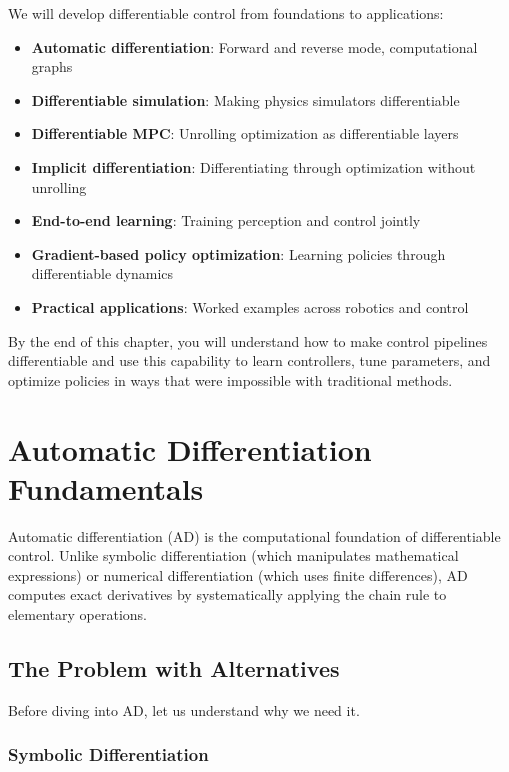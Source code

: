 We will develop differentiable control from foundations to applications:

\begin{itemize}
    \item \textbf{Automatic differentiation}: Forward and reverse mode, computational graphs
    \item \textbf{Differentiable simulation}: Making physics simulators differentiable
    \item \textbf{Differentiable MPC}: Unrolling optimization as differentiable layers
    \item \textbf{Implicit differentiation}: Differentiating through optimization without unrolling
    \item \textbf{End-to-end learning}: Training perception and control jointly
    \item \textbf{Gradient-based policy optimization}: Learning policies through differentiable dynamics
    \item \textbf{Practical applications}: Worked examples across robotics and control
\end{itemize}

By the end of this chapter, you will understand how to make control pipelines differentiable and use this capability to learn controllers, tune parameters, and optimize policies in ways that were impossible with traditional methods.

\section{Automatic Differentiation Fundamentals}
\label{sec:autodiff}

Automatic differentiation (AD) is the computational foundation of differentiable control. Unlike symbolic differentiation (which manipulates mathematical expressions) or numerical differentiation (which uses finite differences), AD computes exact derivatives by systematically applying the chain rule to elementary operations.

\subsection{The Problem with Alternatives}

Before diving into AD, let us understand why we need it.

\subsubsection{Symbolic Differentiation}

